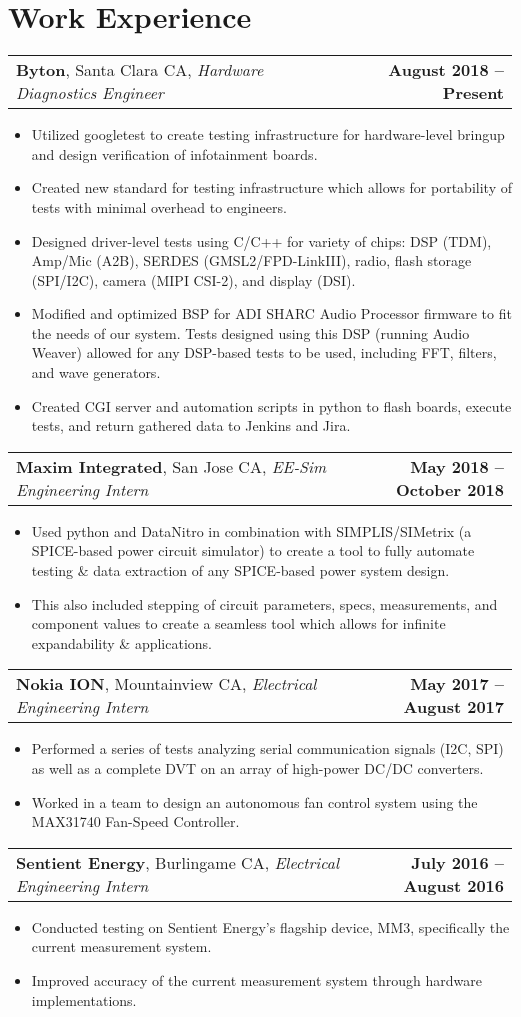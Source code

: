 \documentclass[letterpaper,\fontSize pt]{article}
\makeatletter
\newcommand{\experienceSubheading}[4]{
  \vspace{5pt}
    \begin{tabular*}{\textwidth}[t]{l@{\extracolsep{\fill}}r}
      \textbf{#1}, #2, \textit{#3} & \textbf{#4}
    \end{tabular*}\vspace{-7pt}
}
\newcommand{\resumeItem}[1]{
  \item\small{
    #1 \vspace{-5pt}
  }
}
\newcommand{\resumeItemListStart}{\begin{itemize}}
\newcommand{\resumeItemListEnd}{\end{itemize}\vspace{-5pt}}
\makeatother
\begin{document}
\section{Work Experience}
	\experienceSubheading {Byton}
	{Santa Clara CA}{Hardware Diagnostics Engineer}{August 2018 -- Present}
      	\resumeItemListStart
			\resumeItem {Utilized googletest to create testing infrastructure for hardware-level bringup and design verification of infotainment boards.}
        		\resumeItem {Created new standard for testing infrastructure which allows for portability of tests with minimal overhead to engineers.}
        		\resumeItem {Designed driver-level tests using C/C++ for variety of chips: DSP (TDM), Amp/Mic (A2B), SERDES (GMSL2/FPD-LinkIII), radio, flash storage (SPI/I2C), camera (MIPI CSI-2), and display (DSI).}
        		\ifdefined\detailedInfo
        		\resumeItem {Modified and optimized BSP for ADI SHARC Audio Processor firmware to fit the needs of our system. Tests designed using this DSP (running Audio Weaver) allowed for any DSP-based tests to be used, including FFT, filters, and wave generators.}
        		\resumeItem {Created CGI server and automation scripts in python to flash boards, execute tests, and return gathered data to Jenkins and Jira.}
        		\fi
      	\resumeItemListEnd
	\experienceSubheading {Maxim Integrated}
	{San Jose CA}{EE-Sim Engineering Intern}{May 2018 – October 2018}
		\resumeItemListStart
			\resumeItem {Used python and DataNitro in combination with SIMPLIS/SIMetrix (a SPICE-based power circuit simulator) to create a tool to fully automate testing \& data extraction of any SPICE-based power system design.}
			\resumeItem {This also included stepping of circuit parameters, specs, measurements, and component values to create a seamless tool which allows for infinite expandability \& applications.}
		\resumeItemListEnd
	\experienceSubheading {Nokia ION}
	{Mountainview CA} {Electrical Engineering Intern}{May 2017 – August 2017}
		\resumeItemListStart
			\resumeItem {Performed a series of tests analyzing serial communication signals (I2C, SPI) as well as a complete DVT on an array of high-power DC/DC converters.}
			\resumeItem {Worked in a team to design an autonomous fan control system using the MAX31740 Fan-Speed Controller.}
		\resumeItemListEnd
	\experienceSubheading {Sentient Energy}
	{Burlingame CA}{Electrical Engineering Intern}{July 2016 -- August 2016}
		\resumeItemListStart
			\resumeItem {Conducted testing on Sentient Energy’s flagship device, MM3, specifically the current measurement system.}
			\resumeItem {Improved accuracy of the current measurement system through hardware implementations.}
		\resumeItemListEnd
\end{document}
